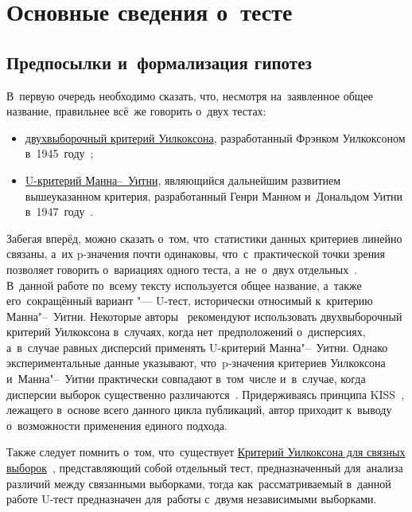 \documentclass[]{scrreprt}
\begin{document}
\chapter{Основные сведения о~тесте}
\section{Предпосылки и~формализация гипотез}
В~первую очередь необходимо сказать, что, несмотря на~заявленное общее название, правильнее всё~же говорить о~двух тестах:
\begin{itemize}
	\item \href{http://www.machinelearning.ru/wiki/index.php?title=Критерий_Уилкоксона_двухвыборочный}{двухвыборочный критерий Уилкоксона}, разработанный Фрэнком Уилкоксоном в~1945~году~\cite{MLRU:Wilcoxon-test};
	\item \href{http://www.machinelearning.ru/wiki/index.php?title=Критерий_Уилкоксона-Манна"--~Уитни}{U-критерий Манна--~Уитни}, являющийся дальнейшим развитием вышеуказанном критерия, разработанный Генри Манном и~Дональдом Уитни в~1947~году~\cite{MLRU:Mann-Whitney}.
\end{itemize}
Забегая вперёд, можно сказать о~том, что~статистики данных критериев линейно связаны, а~их p-значения почти одинаковы, что~с~практической точки зрения позволяет говорить о~вариациях одного теста, а~не~о~двух отдельных~\cite{MLRU:Wilcoxon-test}. В~данной работе по~всему тексту используется общее название, а~также его~сокращённый вариант "--- U-тест, исторически относимый к~критерию Манна"--~Уитни. Некоторые авторы~\cite{Kobzarq-prikl-mathstat} рекомендуют использовать двухвыборочный критерий Уилкоксона в~случаях, когда нет~предположений о~дисперсиях, а~в~случае равных дисперсий применять U-критерий Манна"--~Уитни. Однако экспериментальные данные указывают, что~p-значения критериев Уилкоксона и~Манна"--~Уитни практически совпадают в~том~числе и~в~случае, когда дисперсии выборок существенно различаются~\cite{MLRU:Wilcoxon-test}. Придерживаясь принципа KISS~\cite{KISS-principle}, лежащего в~основе всего данного цикла публикаций, автор приходит к~выводу о~возможности применения единого подхода. 

Также следует помнить о~том, что~существует \href{http://www.machinelearning.ru/wiki/index.php?title=Критерий_Уилкоксона_для_связных_выборок}{Критерий Уилкоксона для связных выборок}~\cite{Wilcoxon-signed-rank-test}, представляющий собой отдельный тест, предназначенный для~анализа различий между связанными выборками, тогда как~рассматриваемый в~данной работе U-тест предназначен для~работы с~двумя независимыми выборками.
\end{document}
